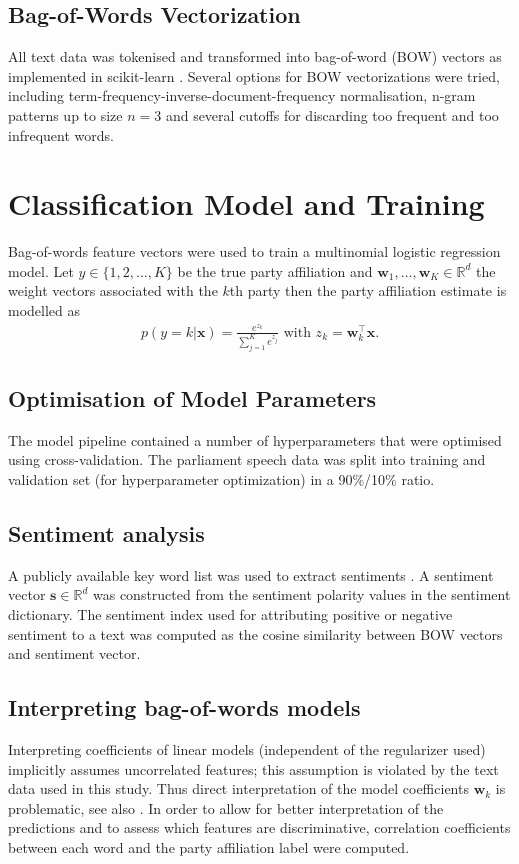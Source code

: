 \documentclass[11pt]{article}
\renewcommand{\vec}[1]{\mathbf{#1}}
\newcommand{\R}{\mathds{R}}
\begin{document}
\subsection{Bag-of-Words Vectorization}\label{sec:bow-vectorization}
All text data was tokenised and transformed into bag-of-word (BOW) vectors as implemented in scikit-learn \cite{scikit-learn}. Several options for BOW vectorizations were tried, including term-frequency-inverse-document-frequency normalisation, n-gram patterns up to size $n=3$ and several cutoffs for discarding too frequent and too infrequent words.

\section{Classification Model and Training}\label{sec:model}
Bag-of-words feature vectors were used to train a multinomial logistic regression model. Let $y\in\{1,2,\dots,K\}$ be the true party affiliation and $\vec{w}_1,\dots,\vec{w}_K\in\R^{d}$ the weight vectors associated with the $k$th party then the party affiliation estimate is modelled as
\begin{eqnarray}\label{eq:logreg_multiclass}
p(y=k|\vec{x}) = \frac{e^{z_k}}{\sum_{j=1}^K e^{z_j}}  \textrm{ with }  z_k=\vec{w}_k^{\top}\vec{x}.
\end{eqnarray}

\subsection{Optimisation of Model Parameters}\label{sec:crossvalidation}
The model pipeline contained a number of  hyperparameters that were optimised using cross-validation. The parliament speech data was split into training and validation set (for hyperparameter optimization) in a 90\%/10\% ratio. 
%
\subsection{Sentiment analysis}\label{sec:sentiment_analysis_methods}
A publicly available key word list was used to extract sentiments \cite{remquahey2010}. A sentiment vector $\vec{s}\in\R^d$ was constructed from the sentiment polarity values in the sentiment dictionary. The sentiment index used for attributing positive or negative sentiment to a text was computed as the cosine similarity between BOW vectors and sentiment vector.

\subsection{Interpreting bag-of-words models}\label{sec:correlations_methods}
Interpreting coefficients of linear models (independent of the regularizer used) implicitly assumes uncorrelated features; this assumption is violated by the text data used in this study. Thus direct interpretation of the model coefficients $\vec{w}_k$ is problematic, see also \cite{Zien2009, Haufe2013}. In order to allow for better interpretation of the predictions and to assess which features are discriminative, correlation coefficients between each word and the party affiliation label were computed. 
\end{document}
